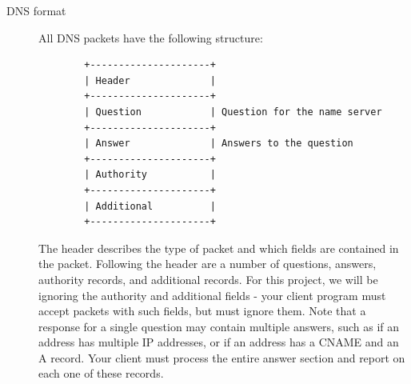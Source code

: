 \documentclass{article}
\begin{document}
\begin{description}
    \item[DNS format] All DNS packets have the following structure:
    \begin{lstlisting}
        +---------------------+
        | Header              |
        +---------------------+
        | Question            | Question for the name server
        +---------------------+
        | Answer              | Answers to the question
        +---------------------+
        | Authority           |
        +---------------------+
        | Additional          |
        +---------------------+
    \end{lstlisting}
    
    The header describes the type of packet and which fields are contained in the packet. Following
    the header are a number of questions, answers, authority records, and additional records. For
    this project, we will be ignoring the authority and additional fields - your client program must accept
    packets with such fields, but must ignore them.
    Note that a response for a single question may contain multiple answers, such as if an address
    has multiple IP addresses, or if an address has a CNAME and an A record. Your client must process
    the entire answer section and report on each one of these records.
    

\end{description}
\end{document}
